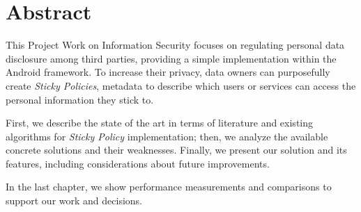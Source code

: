 \chapter*{Abstract}

\noindent This Project Work on Information Security focuses on regulating personal data disclosure among third parties, providing a simple implementation within the Android framework. To increase their privacy, data owners can purposefully create \textit{Sticky Policies}, metadata to describe which users or services can access the personal information they stick to.

First, we describe the state of the art in terms of literature and existing algorithms for \textit{Sticky Policy} implementation; then, we analyze the available concrete solutions and their weaknesses. Finally, we present our solution and its features, including considerations about future improvements.

In the last chapter, we show performance measurements and comparisons to support our work and decisions.